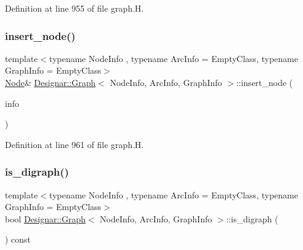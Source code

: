 Definition at line 955 of file graph.\+H.

\mbox{\label{class_designar_1_1_graph_abbf6788c27f9719907d31fe7f7a83920}} 
\subsubsection{\texorpdfstring{insert\+\_\+node()}{insert\_node()}\hspace{0.1cm}{\footnotesize\ttfamily [4/4]}}
{\footnotesize\ttfamily template$<$typename Node\+Info , typename Arc\+Info  = Empty\+Class, typename Graph\+Info  = Empty\+Class$>$ \\
\hyperlink{class_designar_1_1_graph_a5dfc7dba9d092ac489c72e40390c37d0}{Node}\& \hyperlink{class_designar_1_1_graph}{Designar\+::\+Graph}$<$ Node\+Info, Arc\+Info, Graph\+Info $>$\+::insert\+\_\+node (\begin{DoxyParamCaption}\item[{Node\+Info \&\&}]{info }\end{DoxyParamCaption})\hspace{0.3cm}{\ttfamily [inline]}}



Definition at line 961 of file graph.\+H.

\mbox{\label{class_designar_1_1_graph_af0e0b3d1d6a52e0f3d3225f1fa274211}} 
\subsubsection{\texorpdfstring{is\+\_\+digraph()}{is\_digraph()}}
{\footnotesize\ttfamily template$<$typename Node\+Info , typename Arc\+Info  = Empty\+Class, typename Graph\+Info  = Empty\+Class$>$ \\
bool \hyperlink{class_designar_1_1_graph}{Designar\+::\+Graph}$<$ Node\+Info, Arc\+Info, Graph\+Info $>$\+::is\+\_\+digraph (\begin{DoxyParamCaption}{ }\end{DoxyParamCaption}) const\hspace{0.3cm}{\ttfamily [inline]}}



